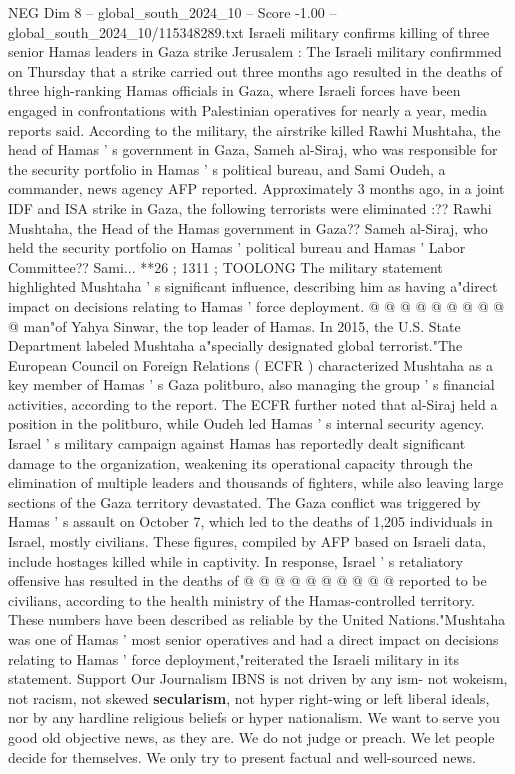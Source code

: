 \begin{textsample}{NEG Dim 8 – global\_south\_2024\_10 – Score -1.00 – global\_south\_2024\_10/115348289.txt}  \label{ex:f8_neg_191}
Israeli military confirms killing of three senior Hamas leaders in Gaza strike Jerusalem : The Israeli military confirmmed on Thursday that a strike carried out three months ago resulted in the deaths of three high-ranking Hamas officials in Gaza, where Israeli forces have been engaged in confrontations with Palestinian operatives for nearly a year, media reports said.
According to the military, the airstrike killed Rawhi Mushtaha, the head of Hamas ' s government in Gaza, Sameh al-Siraj, who was responsible for the security portfolio in Hamas ' s political bureau, and Sami Oudeh, a commander, news agency AFP reported.
Approximately 3 months ago, in a joint IDF and ISA strike in Gaza, the following terrorists were eliminated :??
Rawhi Mushtaha, the Head of the Hamas government in Gaza??
Sameh al-Siraj, who held the security portfolio on Hamas ' political bureau and Hamas ' Labor Committee??
Sami... **26 ; 1311 ; TOOLONG The military statement highlighted Mushtaha ' s significant influence, describing him as having a"direct impact on decisions relating to Hamas ' force deployment. @ @ @ @ @ @ @ @ @ @ man"of Yahya Sinwar, the top leader of Hamas.
In 2015, the U.S.
State Department labeled Mushtaha a"specially designated global terrorist."The European Council on Foreign Relations ( ECFR ) characterized Mushtaha as a key member of Hamas ' s Gaza politburo, also managing the group ' s financial activities, according to the report.
The ECFR further noted that al-Siraj held a position in the politburo, while Oudeh led Hamas ' s internal security agency.
Israel ' s military campaign against Hamas has reportedly dealt significant damage to the organization, weakening its operational capacity through the elimination of multiple leaders and thousands of fighters, while also leaving large sections of the Gaza territory devastated.
The Gaza conflict was triggered by Hamas ' s assault on October 7, which led to the deaths of 1,205 individuals in Israel, mostly civilians.
These figures, compiled by AFP based on Israeli data, include hostages killed while in captivity.
In response, Israel ' s retaliatory offensive has resulted in the deaths of @ @ @ @ @ @ @ @ @ @ reported to be civilians, according to the health ministry of the Hamas-controlled territory.
These numbers have been described as reliable by the United Nations."Mushtaha was one of Hamas ' most senior operatives and had a direct impact on decisions relating to Hamas ' force deployment,"reiterated the Israeli military in its statement.
Support Our Journalism IBNS is not driven by any ism- not wokeism, not racism, not skewed \textbf{secularism}, not hyper right-wing or left liberal ideals, nor by any hardline religious beliefs or hyper nationalism.
We want to serve you good old objective news, as they are.
We do not judge or preach.
We let people decide for themselves.
We only try to present factual and well-sourced news.

\end{textsample}

